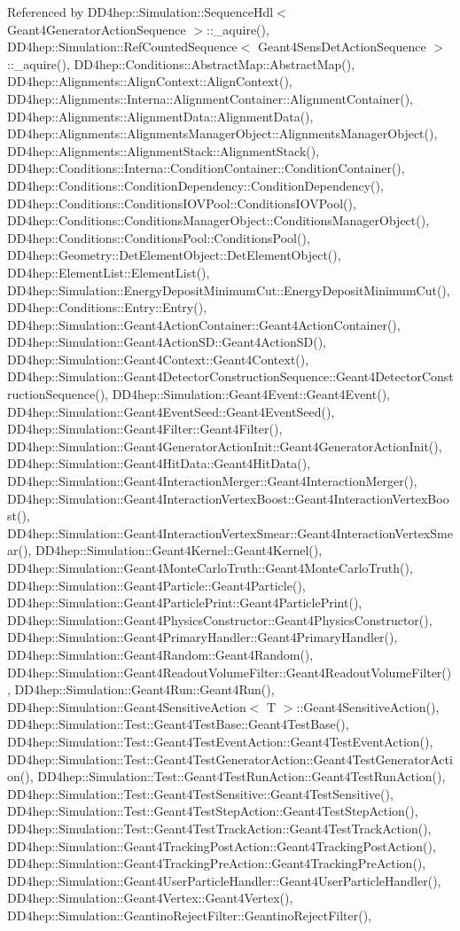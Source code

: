 Referenced by DD4hep::Simulation::SequenceHdl$<$ Geant4GeneratorActionSequence $>$::\_\-aquire(), DD4hep::Simulation::RefCountedSequence$<$ Geant4SensDetActionSequence $>$::\_\-aquire(), DD4hep::Conditions::AbstractMap::AbstractMap(), DD4hep::Alignments::AlignContext::AlignContext(), DD4hep::Alignments::Interna::AlignmentContainer::AlignmentContainer(), DD4hep::Alignments::AlignmentData::AlignmentData(), DD4hep::Alignments::AlignmentsManagerObject::AlignmentsManagerObject(), DD4hep::Alignments::AlignmentStack::AlignmentStack(), DD4hep::Conditions::Interna::ConditionContainer::ConditionContainer(), DD4hep::Conditions::ConditionDependency::ConditionDependency(), DD4hep::Conditions::ConditionsIOVPool::ConditionsIOVPool(), DD4hep::Conditions::ConditionsManagerObject::ConditionsManagerObject(), DD4hep::Conditions::ConditionsPool::ConditionsPool(), DD4hep::Geometry::DetElementObject::DetElementObject(), DD4hep::ElementList::ElementList(), DD4hep::Simulation::EnergyDepositMinimumCut::EnergyDepositMinimumCut(), DD4hep::Conditions::Entry::Entry(), DD4hep::Simulation::Geant4ActionContainer::Geant4ActionContainer(), DD4hep::Simulation::Geant4ActionSD::Geant4ActionSD(), DD4hep::Simulation::Geant4Context::Geant4Context(), DD4hep::Simulation::Geant4DetectorConstructionSequence::Geant4DetectorConstructionSequence(), DD4hep::Simulation::Geant4Event::Geant4Event(), DD4hep::Simulation::Geant4EventSeed::Geant4EventSeed(), DD4hep::Simulation::Geant4Filter::Geant4Filter(), DD4hep::Simulation::Geant4GeneratorActionInit::Geant4GeneratorActionInit(), DD4hep::Simulation::Geant4HitData::Geant4HitData(), DD4hep::Simulation::Geant4InteractionMerger::Geant4InteractionMerger(), DD4hep::Simulation::Geant4InteractionVertexBoost::Geant4InteractionVertexBoost(), DD4hep::Simulation::Geant4InteractionVertexSmear::Geant4InteractionVertexSmear(), DD4hep::Simulation::Geant4Kernel::Geant4Kernel(), DD4hep::Simulation::Geant4MonteCarloTruth::Geant4MonteCarloTruth(), DD4hep::Simulation::Geant4Particle::Geant4Particle(), DD4hep::Simulation::Geant4ParticlePrint::Geant4ParticlePrint(), DD4hep::Simulation::Geant4PhysicsConstructor::Geant4PhysicsConstructor(), DD4hep::Simulation::Geant4PrimaryHandler::Geant4PrimaryHandler(), DD4hep::Simulation::Geant4Random::Geant4Random(), DD4hep::Simulation::Geant4ReadoutVolumeFilter::Geant4ReadoutVolumeFilter(), DD4hep::Simulation::Geant4Run::Geant4Run(), DD4hep::Simulation::Geant4SensitiveAction$<$ T $>$::Geant4SensitiveAction(), DD4hep::Simulation::Test::Geant4TestBase::Geant4TestBase(), DD4hep::Simulation::Test::Geant4TestEventAction::Geant4TestEventAction(), DD4hep::Simulation::Test::Geant4TestGeneratorAction::Geant4TestGeneratorAction(), DD4hep::Simulation::Test::Geant4TestRunAction::Geant4TestRunAction(), DD4hep::Simulation::Test::Geant4TestSensitive::Geant4TestSensitive(), DD4hep::Simulation::Test::Geant4TestStepAction::Geant4TestStepAction(), DD4hep::Simulation::Test::Geant4TestTrackAction::Geant4TestTrackAction(), DD4hep::Simulation::Geant4TrackingPostAction::Geant4TrackingPostAction(), DD4hep::Simulation::Geant4TrackingPreAction::Geant4TrackingPreAction(), DD4hep::Simulation::Geant4UserParticleHandler::Geant4UserParticleHandler(), DD4hep::Simulation::Geant4Vertex::Geant4Vertex(), DD4hep::Simulation::GeantinoRejectFilter::GeantinoRejectFilter(), 